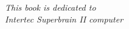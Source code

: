 \begin{titlepage}
\vspace*{\fill}

\begin{flushright}
\emph{This book is dedicated to \\
Intertec Superbrain II computer}

\end{flushright}

\vspace*{\fill}
\end{titlepage}

